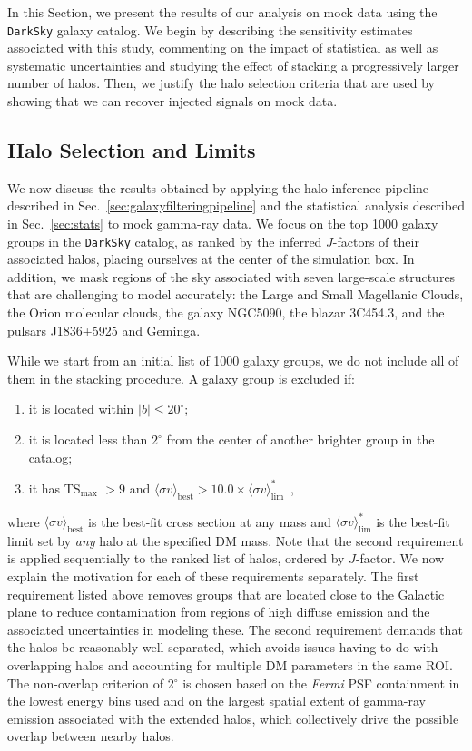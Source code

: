 In this Section, we present the results of our analysis on mock data using the \texttt{DarkSky} galaxy catalog. We begin by describing the sensitivity estimates associated with this study, commenting on the impact of statistical as well as systematic uncertainties and studying the effect of stacking a progressively larger number of halos.  Then, we justify the halo selection criteria that are used by showing that we can recover injected signals on mock data. 

\subsection{Halo Selection and Limits}
\label{sec:limits}

We now discuss the results obtained by applying the halo inference pipeline described in Sec.~\ref{sec:galaxyfilteringpipeline} and the  statistical analysis described in Sec.~\ref{sec:stats} to  mock gamma-ray data.  We focus on the top 1000 galaxy groups in the \texttt{DarkSky} catalog, as ranked by the inferred $J$-factors of their associated halos, placing ourselves at the center of the simulation box. In addition, we mask regions of the sky associated with seven large-scale structures that are challenging to model accurately: the Large and Small Magellanic Clouds, the Orion molecular clouds, the galaxy NGC5090, the blazar 3C454.3, and the pulsars J1836+5925 and Geminga. 

While we start from an initial list of 1000 galaxy groups, we do not include all of them in the stacking procedure.  A galaxy group is excluded if: 
\begin{enumerate}
\item it is located within $|b| \leq 20^\circ$;
\item it is located less than $2^\circ$ from the center of another brighter group in the catalog;
\item it has TS$_\text{max}$ $> 9$ and $\langle \sigma v \rangle_\text{best}  > 10.0 \times \langle \sigma v \rangle_\text{lim}^*$\, ,
\end{enumerate}
where $\langle \sigma v \rangle_\text{best}$ is the best-fit cross section at any mass and $\langle \sigma v \rangle^*_\text{lim}$ is the best-fit limit set by \emph{any} halo at the specified DM mass.  Note that the second requirement is applied sequentially to the ranked list of halos, ordered by $J$-factor.  
We now explain the motivation for each of these requirements separately.  The first requirement listed above removes groups that are located close to the Galactic plane to reduce contamination from regions of high diffuse emission and the associated uncertainties in modeling these. The second requirement demands that the halos be reasonably well-separated, which avoids issues having to do with overlapping halos and accounting for multiple DM parameters in the same ROI. The non-overlap criterion of 2$^\circ$ is chosen based on the \emph{Fermi} PSF containment in the lowest energy bins used and on the largest spatial extent of gamma-ray emission associated with the extended halos, which collectively drive the possible overlap between nearby halos.


